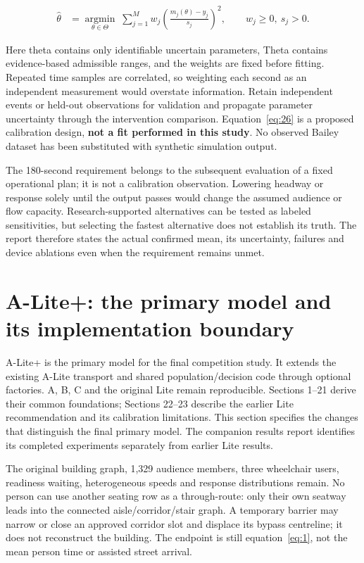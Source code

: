 \documentclass[11pt,a4paper]{article}
\begin{document}
\begin{equation}
\begin{aligned}
\widehat{\theta}&=\underset{\theta\in\Theta}{\operatorname{argmin}}\;
\sum_{j=1}^{M} w_j\left(\frac{m_j(\theta)-y_j}{s_j}\right)^2,\qquad w_j\ge 0,\ s_j>0.
\end{aligned}
\tag{26}\label{eq:26}
\end{equation}

Here theta contains only identifiable uncertain parameters, Theta contains evidence-based admissible ranges, and the weights are fixed before fitting. Repeated time samples are correlated, so weighting each second as an independent measurement would overstate information. Retain independent events or held-out observations for validation and propagate parameter uncertainty through the intervention comparison. Equation~\eqref{eq:26} is a proposed calibration design, \textbf{not a fit performed in this study}. No observed Bailey dataset has been substituted with synthetic simulation output.


The 180-second requirement belongs to the subsequent evaluation of a fixed operational plan; it is not a calibration observation. Lowering headway or response solely until the output passes would change the assumed audience or flow capacity. Research-supported alternatives can be tested as labeled sensitivities, but selecting the fastest alternative does not establish its truth. The report therefore states the actual confirmed mean, its uncertainty, failures and device ablations even when the requirement remains unmet.


\section{A-Lite+: the primary model and its implementation boundary}\label{sec:24}

A-Lite+ is the primary model for the final competition study. It extends the existing A-Lite transport and shared population/decision code through optional factories. A, B, C and the original Lite remain reproducible. Sections 1–21 derive their common foundations; Sections 22–23 describe the earlier Lite recommendation and its calibration limitations. This section specifies the changes that distinguish the final primary model. The companion results report identifies its completed experiments separately from earlier Lite results.


The original building graph, 1,329 audience members, three wheelchair users, readiness waiting, heterogeneous speeds and response distributions remain. No person can use another seating row as a through-route: only their own seatway leads into the connected aisle/corridor/stair graph. A temporary barrier may narrow or close an approved corridor slot and displace its bypass centreline; it does not reconstruct the building. The endpoint is still equation~\eqref{eq:1}, not the mean person time or assisted street arrival.
\end{document}
